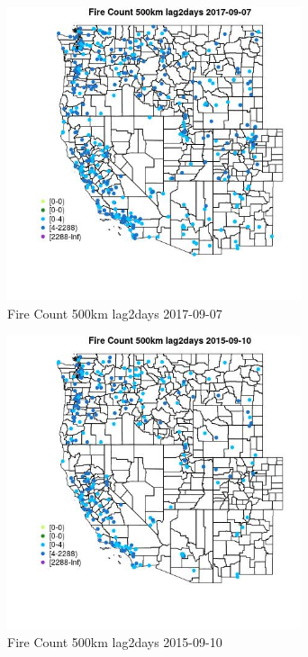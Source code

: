 \begin{figure} 
\centering  
\includegraphics[width=0.77\textwidth]{Code_Outputs/Report_ML_input_PM25_Step4_part_e_de_duplicated_aves_compiled_2019-05-21wNAs_MapObsFire_Count_500km_lag2days2017-09-07.jpg} 
\caption{\label{fig:Report_ML_input_PM25_Step4_part_e_de_duplicated_aves_compiled_2019-05-21wNAsMapObsFire_Count_500km_lag2days2017-09-07}Fire Count 500km lag2days 2017-09-07} 
\end{figure} 
 

\begin{figure} 
\centering  
\includegraphics[width=0.77\textwidth]{Code_Outputs/Report_ML_input_PM25_Step4_part_e_de_duplicated_aves_compiled_2019-05-21wNAs_MapObsFire_Count_500km_lag2days2015-09-10.jpg} 
\caption{\label{fig:Report_ML_input_PM25_Step4_part_e_de_duplicated_aves_compiled_2019-05-21wNAsMapObsFire_Count_500km_lag2days2015-09-10}Fire Count 500km lag2days 2015-09-10} 
\end{figure} 
 

